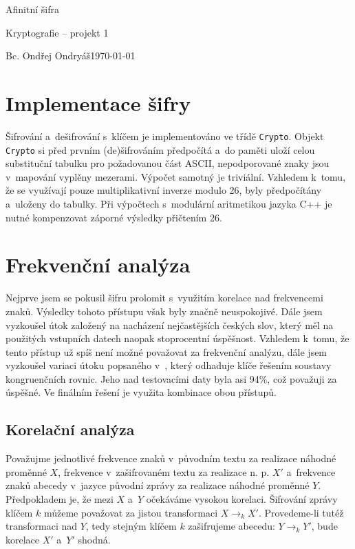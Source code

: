 \documentclass[11pt]{article}
\begin{document}
\begin{center}
\Huge
Afinitní šifra

\LARGE
Kryptografie -- projekt 1
\end{center}

\vspace{1cm}

{\Large
Bc. Ondřej Ondryáš\hfill\today
}

\vspace{1.5cm}

\section{Implementace šifry}

Šifrování a~dešifrování s~klíčem je implementováno ve třídě \texttt{Crypto}. Objekt \texttt{Crypto} si před prvním (de)šifrováním předpočítá a~do paměti uloží celou substituční tabulku pro požadovanou část ASCII, nepodporované znaky jsou v~mapování vyplěny mezerami. Výpočet samotný je triviální. Vzhledem k~tomu, že se využívají pouze multiplikativní inverze modulo 26, byly předpočítány a~uloženy do tabulky. Při výpočtech s~modulární aritmetikou jazyka C++ je nutné kompenzovat záporné výsledky přičtením 26.

\section{Frekvenční analýza}

Nejprve jsem se pokusil šifru prolomit s~využitím korelace nad frekvencemi znaků. Výsledky tohoto přístupu však byly značně neuspokojivé. Dále jsem vyzkoušel útok založený na nacházení nejčastějších českých slov, který měl na použitých vstupních datech naopak stoprocentní úspěšnost. Vzhledem k~tomu, že tento přístup už spíš není možné považovat za frekvenční analýzu, dále jsem vyzkoušel variaci útoku popsaného v~\cite{chr:affine}, který odhaduje klíče řešením soustavy kongruenčních rovnic. Jeho nad testovacími daty byla asi 94\%, což považuji za úspěšné. Ve finálním řešení je využita kombinace obou přístupů.

\subsection{Korelační analýza}

Považujme jednotlivé frekvence znaků v~původním textu za realizace náhodné proměnné $X$, frekvence v~zašifrovaném textu za realizace n. p. $X'$ a~frekvence znaků abecedy v~jazyce původní zprávy za realizace náhodné proměnné $Y$. Předpokladem je, že mezi $X$ a~$Y$ očekáváme vysokou korelaci. Šifrování zprávy klíčem $k$ můžeme považovat za jistou transformaci $X \rightarrow_{k} X'$. Provedeme-li tutéž transformaci nad $Y$, tedy stejným klíčem $k$ zašifrujeme abecedu: $Y \rightarrow_{k} Y'$, bude korelace $X'$ a~$Y'$ shodná.
\end{document}
